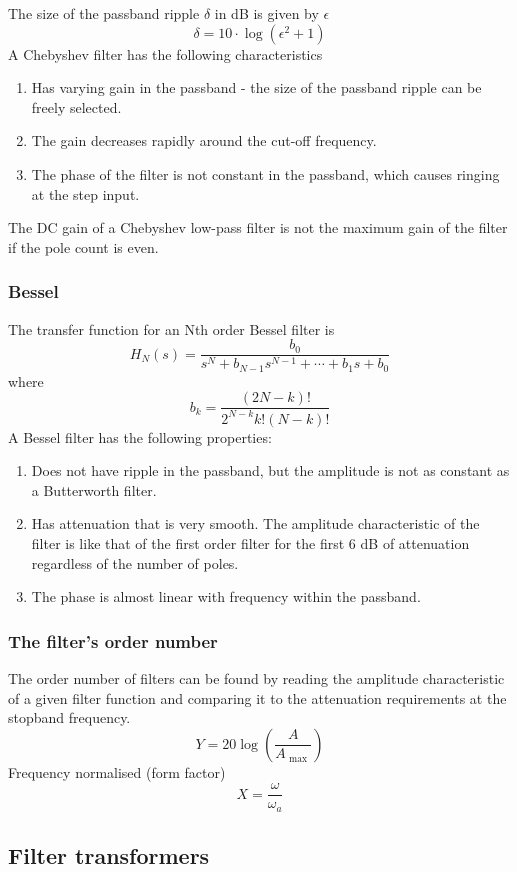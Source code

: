 The size of the passband ripple $\delta$ in dB is given by $\epsilon$
$$\delta=10\cdot \log(\epsilon^2+1)$$
A Chebyshev filter has the following characteristics 
\begin{enumerate}
  \item Has varying gain in the passband - the size of the passband ripple can be freely selected. 
  \item The gain decreases rapidly around the cut-off frequency. 
  \item The phase of the filter is not constant in the passband, which causes ringing at the step input.
\end{enumerate}
The DC gain of a Chebyshev low-pass filter is not the maximum gain of the filter if the pole count is even.

\subsubsection{Bessel}
The transfer function for an Nth order Bessel filter is
$$H_{N}(s)=\frac{b_{0}}{s^N+b_{N-1} s^{N-1}+\cdots +b_{1}s+b_{0}} $$
where
$$b_{k}=\frac{(2N-k)!}{2^{N-k}k!(N-k)!}$$
A Bessel filter has the following properties:
\begin{enumerate}
  \item Does not have ripple in the passband, but the amplitude is not as constant as a Butterworth filter. 
  \item Has attenuation that is very smooth. The amplitude characteristic of the filter is like that of the first order filter for the first 6 dB of attenuation regardless of the number of poles. 
  \item The phase is almost linear with frequency within the passband.
\end{enumerate}

\subsubsection{The filter's order number}
The order number of filters can be found by reading the amplitude characteristic of a given filter function and comparing it to the attenuation requirements at the stopband frequency. 
$$Y=20\log\left( \frac{A}{A_{\text{ max }}} \right)$$
Frequency normalised (form factor)
$$X=\frac{\omega}{\omega_{a}}$$


\subsection{Filter transformers}
